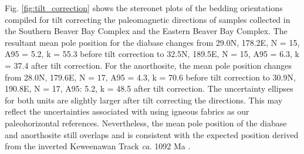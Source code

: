 Fig. \ref{fig:tilt_correction} shows the stereonet plots of the bedding orientations compiled for tilt correcting the paleomagnetic directions of samples collected in the Southern Beaver Bay Complex and the Eastern Beaver Bay Complex. The resultant mean pole position for the diabase changes from 29.0\textdegree N, 178.2\textdegree E, N = 15, A95 = 5.2, k = 55.3 before tilt correction to 32.5\textdegree N, 189.5\textdegree E, N = 15, A95 = 6.3, k = 37.4 after tilt correction. For the anorthosite, the mean pole position changes from 28.0\textdegree N, 179.6\textdegree E, N = 17, A95 = 4.3, k = 70.6 before tilt correction to 30.9\textdegree N, 190.8\textdegree E, N = 17, A95: 5.2, k = 48.5 after tilt correction. The uncertainty ellipses for both units are slightly larger after tilt correcting the directions. This may reflect the uncertainties associated with using igneous fabrics as our paleohorizontal references. Nevertheless, the mean pole position of the diabase and anorthosite still overlaps and is consistent with the expected position derived from the inverted Keweenawan Track \textit{ca.} 1092 Ma \citep{Swanson-Hysell2019a}. 


\clearpage


\clearpage


\nocite{Mattinson2005a, Condon2015a, Schmitz2007a, Jaffe1975a}

\clearpage


